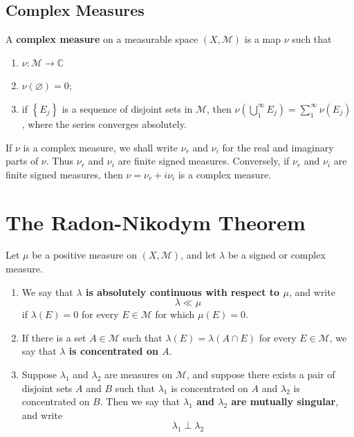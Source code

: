 \documentclass[12pt, a4paper, oneside]{book}
\begin{document}
\subsection{Complex Measures}
\begin{definition}
    A \textbf{complex measure} on a measurable space $(X, \mathcal{M})$ is a map $\nu$ such that
    \begin{enumerate}[label=(\roman*)]
        \item $\nu: \mathcal{M} \rightarrow \mathbb{C}$
        \item
              $\nu(\varnothing)=0$;
        \item
              if $\left\{E_j\right\}$ is a sequence of disjoint sets in $\mathcal{M}$, then $\nu\left(\bigcup_1^{\infty} E_j\right)=\sum_1^{\infty} \nu\left(E_j\right)$, where the series converges absolutely.
    \end{enumerate}
    \begin{remark}
        If $\nu$ is a complex measure, we shall write $\nu_r$ and $\nu_i$ for the real and imaginary parts of $\nu$. Thus $\nu_r$ and $\nu_i$ are finite signed measures.
        Conversely, if $\nu_r$ and $\nu_i$ are finite signed measures, then $\nu=\nu_r+i \nu_i$ is a complex measure.
    \end{remark}
\end{definition}




\section{The Radon-Nikodym Theorem} %
\begin{definition}
    Let $\mu$ be a positive measure on $\left(X,\mathcal{M}\right)$, and let $\lambda$ be a signed or complex measure.
    \begin{enumerate}
        \item
              We say that \textbf{$\lambda$ is absolutely continuous with respect to $\mu$}, and write
              \begin{equation*}
                  \lambda \ll \mu
              \end{equation*}
              if $\lambda(E)=0$ for every $E \in \mathcal{M}$ for which $\mu(E)=0$.

        \item
              If there is a set $A \in \mathcal{M}$ such that $\lambda(E)=\lambda(A \cap E)$ for every $E \in \mathcal{M}$, we say that \textbf{$\lambda$ is concentrated on $A$}.

        \item
              Suppose $\lambda_1$ and $\lambda_2$ are measures on $\mathcal{M}$, and suppose there exists a pair of disjoint sets $A$ and $B$ such that $\lambda_1$ is concentrated on $A$ and $\lambda_2$ is concentrated on $B$. Then we say that \textbf{$\lambda_1$ and $\lambda_2$ are mutually singular}, and write
              $$
                  \lambda_1 \perp \lambda_2
              $$
    \end{enumerate}
\end{definition}
\end{document}
